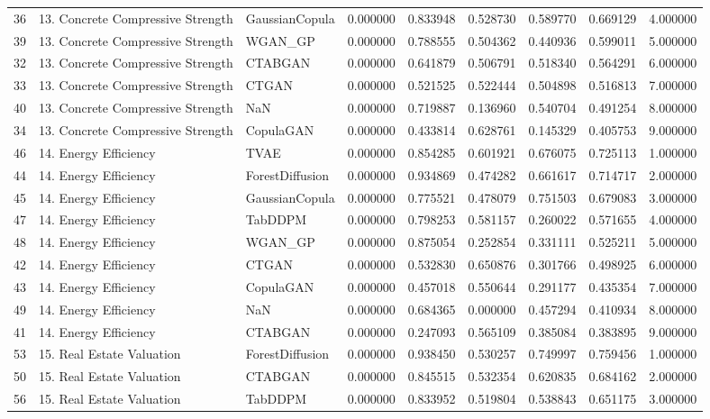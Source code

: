 \begin{tabular}{lllrrrrrr}
36 & 13. Concrete Compressive Strength & GaussianCopula & 0.000000 & 0.833948 & 0.528730 & 0.589770 & 0.669129 & 4.000000 \\
39 & 13. Concrete Compressive Strength & WGAN_GP & 0.000000 & 0.788555 & 0.504362 & 0.440936 & 0.599011 & 5.000000 \\
32 & 13. Concrete Compressive Strength & CTABGAN & 0.000000 & 0.641879 & 0.506791 & 0.518340 & 0.564291 & 6.000000 \\
33 & 13. Concrete Compressive Strength & CTGAN & 0.000000 & 0.521525 & 0.522444 & 0.504898 & 0.516813 & 7.000000 \\
40 & 13. Concrete Compressive Strength & NaN & 0.000000 & 0.719887 & 0.136960 & 0.540704 & 0.491254 & 8.000000 \\
34 & 13. Concrete Compressive Strength & CopulaGAN & 0.000000 & 0.433814 & 0.628761 & 0.145329 & 0.405753 & 9.000000 \\
46 & 14. Energy Efficiency & TVAE & 0.000000 & 0.854285 & 0.601921 & 0.676075 & 0.725113 & 1.000000 \\
44 & 14. Energy Efficiency & ForestDiffusion & 0.000000 & 0.934869 & 0.474282 & 0.661617 & 0.714717 & 2.000000 \\
45 & 14. Energy Efficiency & GaussianCopula & 0.000000 & 0.775521 & 0.478079 & 0.751503 & 0.679083 & 3.000000 \\
47 & 14. Energy Efficiency & TabDDPM & 0.000000 & 0.798253 & 0.581157 & 0.260022 & 0.571655 & 4.000000 \\
48 & 14. Energy Efficiency & WGAN_GP & 0.000000 & 0.875054 & 0.252854 & 0.331111 & 0.525211 & 5.000000 \\
42 & 14. Energy Efficiency & CTGAN & 0.000000 & 0.532830 & 0.650876 & 0.301766 & 0.498925 & 6.000000 \\
43 & 14. Energy Efficiency & CopulaGAN & 0.000000 & 0.457018 & 0.550644 & 0.291177 & 0.435354 & 7.000000 \\
49 & 14. Energy Efficiency & NaN & 0.000000 & 0.684365 & 0.000000 & 0.457294 & 0.410934 & 8.000000 \\
41 & 14. Energy Efficiency & CTABGAN & 0.000000 & 0.247093 & 0.565109 & 0.385084 & 0.383895 & 9.000000 \\
53 & 15. Real Estate Valuation & ForestDiffusion & 0.000000 & 0.938450 & 0.530257 & 0.749997 & 0.759456 & 1.000000 \\
50 & 15. Real Estate Valuation & CTABGAN & 0.000000 & 0.845515 & 0.532354 & 0.620835 & 0.684162 & 2.000000 \\
56 & 15. Real Estate Valuation & TabDDPM & 0.000000 & 0.833952 & 0.519804 & 0.538843 & 0.651175 & 3.000000 \\

\end{tabular}
